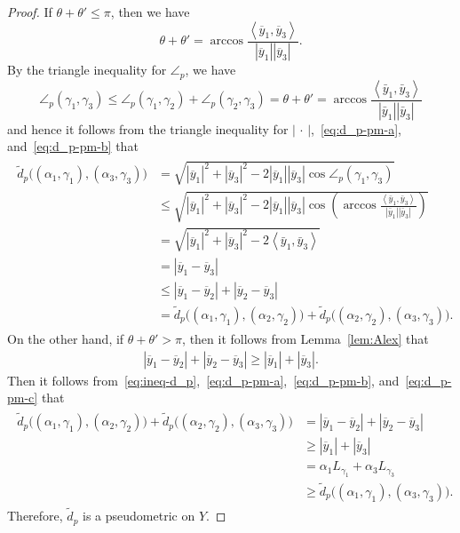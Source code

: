 \documentclass[10pt,a4paper]{amsart}
\providecommand{\abs}[1]{\left\lvert#1\right\rvert}
\newcommand{\ip}[2]{\left\langle #1, #2 \right\rangle}
\begin{document}
\begin{proof}
 If $\theta+\theta'\leq \pi$, then we have 
 \[
  \theta + \theta' 
  = \arccos \frac{\ip{\overline{y}_1}{\overline{y}_3}}
  {\abs{\overline{y}_1}\abs{\overline{y}_3}}.  
 \]
 By the triangle inequality for $\angle_p$, we have 
 \[
  \angle_p(\gamma_1, \gamma_3) 
  \leq \angle_p(\gamma_1, \gamma_2) +   \angle_p(\gamma_2, \gamma_3) 
  =\theta + \theta' =
  \arccos \frac{\ip{\bar{y}_1}{\bar{y}_3}}{\abs{\bar{y}_1}\abs{\bar{y}_3}}
 \]
 and hence it follows from 
 the triangle inequality 
 for $\abs{\,\cdot \,}$,~\eqref{eq:d_p-pm-a}, 
 and~\eqref{eq:d_p-pm-b} that 
 \begin{align*}
  \begin{split}
  \tilde{d}_p\bigl((\alpha_1, \gamma_1), (\alpha_3, \gamma_3)\bigr) 
  &=\sqrt{\abs{\overline{y}_1}^2 + \abs{\overline{y}_3}^2 
 -2\abs{\overline{y}_1}\abs{\overline{y}_3}\cos \angle_p(\gamma_1, \gamma_3)} \\
  &\leq \sqrt{\abs{\overline{y}_1}^2 + \abs{\overline{y}_3}^2 
 -2\abs{\overline{y}_1}\abs{\overline{y}_3}
 \cos \left(
 \arccos \frac{\ip{\bar{y}_1}{\bar{y}_3}}{\abs{\bar{y}_1}\abs{\bar{y}_3}}
 \right)
 } \\
  &= \sqrt{\abs{\overline{y}_1}^2 + \abs{\overline{y}_3}^2 
 -2\ip{\bar{y}_1}{\bar{y}_3}} \\
  &=\abs{\overline{y}_1-\overline{y}_3} \\
  &\leq \abs{\overline{y}_1-\overline{y}_2} + \abs{\overline{y}_2-\overline{y}_3} \\
  &= \tilde{d}_p\bigl((\alpha_1, \gamma_1), (\alpha_2, \gamma_2)\bigr) 
  + \tilde{d}_p\bigl((\alpha_2, \gamma_2), (\alpha_3, \gamma_3)\bigr). 
  \end{split}
 \end{align*}
On the other hand, if $\theta + \theta' > \pi$, 
 then it follows from Lemma~\ref{lem:Alex} that 
 \begin{align}\label{eq:d_p-pm-c}
  \abs{\overline{y}_1 - \overline{y}_2} + \abs{\overline{y}_2-\overline{y}_3} 
  \geq \abs{\overline{y}_1} + \abs{\overline{y}_3}. 
 \end{align}
 Then it 
 follows from~\eqref{eq:ineq-d_p},~\eqref{eq:d_p-pm-a},~\eqref{eq:d_p-pm-b}, and~\eqref{eq:d_p-pm-c} that 
 \begin{align*}
  \begin{split}
   \tilde{d}_p\bigl((\alpha_1, \gamma_1), (\alpha_2, \gamma_2)\bigr) 
  + \tilde{d}_p\bigl((\alpha_2, \gamma_2), (\alpha_3, \gamma_3)\bigr) 
  &= \abs{\overline{y}_1 - \overline{y}_2} + \abs{\overline{y}_2-\overline{y}_3} \\
  &\geq \abs{\overline{y}_1} + \abs{\overline{y}_3} \\
  &= \alpha_1 L_{\gamma_1} + \alpha_3 L_{\gamma_3} \\
  &\geq \tilde{d}_p\bigl((\alpha_1, \gamma_1), (\alpha_3, \gamma_3)\bigr). 
  \end{split}
 \end{align*}
 Therefore, $\tilde{d}_p$ is a pseudometric on $Y$. 
\end{proof}
\end{document}
